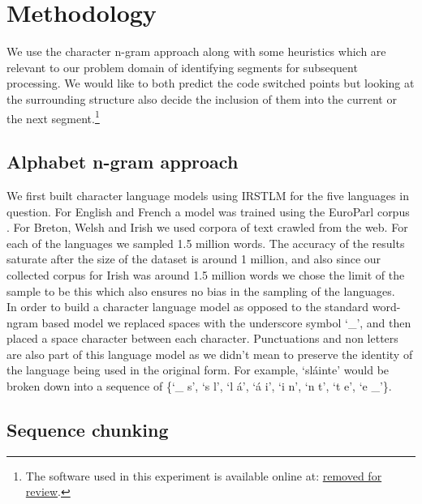 \documentclass[11pt]{article}
\begin{document}
\section{Methodology}
\label{sec:method}
We use the character n-gram approach along with some heuristics which are relevant to our problem domain of identifying
segments for subsequent processing. We would like 
to both predict the code switched points but looking at the surrounding structure also decide the inclusion of them 
into the current or the next segment.\footnote{The software used in this experiment is available online at: \url{removed for review}.}

\subsection{Alphabet n-gram approach}
\label{alphan}

We first built character language models using IRSTLM \cite{federico08a} for the five languages in question. For English
and French a model was trained using the EuroParl corpus \cite{koehn2005europarl}. 
For Breton, Welsh and Irish we used corpora of text crawled from the web. For each of the languages we sampled 1.5 million words. The accuracy of the results saturate after the size of the dataset is around 1 million, and also since our collected corpus for Irish was around 1.5 million words we chose the limit of the sample to be this which also ensures no bias in the sampling of the languages. \\
In order to build a character language model as opposed to the standard word-ngram based model we replaced spaces with the underscore 
symbol `\_', and then placed a space character between each character. Punctuations and non letters are also part of this language model as we didn't mean to preserve the identity of the language being used in the original form. For example, `sl\'{a}inte' would be broken down into a sequence 
of \{`\_ s', `s l', `l \'{a}', `\'{a} i', `i n', `n t', `t e', `e \_'\}. 


\subsection{Sequence chunking}
\label{cschunking}
\end{document}
